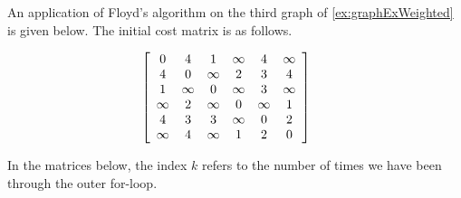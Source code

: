 \begin{Boxample}[0]
\label{eg:floyd}
An application of Floyd's algorithm on the third graph of
\cref{ex:graphExWeighted} is given below.  The initial cost 
matrix is as follows.

\[ 
\left[
\begin{array}{cccccc} %
0        & 4        & 1        & \infty & 4        & \infty \\
4        & 0        & \infty & 2        & 3        & 4 \\
1        &  \infty  & 0        &  \infty  & 3        &  \infty  \\
 \infty  & 2        &  \infty  & 0        &  \infty  & 1 \\
4        & 3        & 3        &  \infty  & 0        & 2 \\
 \infty  & 4        &  \infty  & 1        & 2        & 0 \\
\end{array}
\right]
\hspace{.5cm}
\]

In the matrices below, the index $k$ refers to
the number of times we have been through the outer for-loop.


\end{Boxample}
